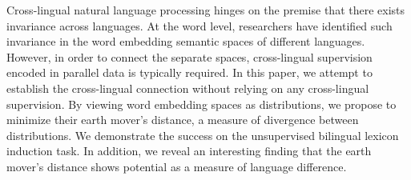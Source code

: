 Cross-lingual natural language processing hinges on the premise that there exists invariance across languages. At the word level, researchers have identified such invariance in the word embedding semantic spaces of different languages. However, in order to connect the separate spaces, cross-lingual supervision encoded in parallel data is typically required. In this paper, we attempt to establish the cross-lingual connection without relying on any cross-lingual supervision. By viewing word embedding spaces as distributions, we propose to minimize their earth mover's distance, a measure of divergence between distributions. We demonstrate the success on the unsupervised bilingual lexicon induction task. In addition, we reveal an interesting finding that the earth mover's distance shows potential as a measure of language difference.
